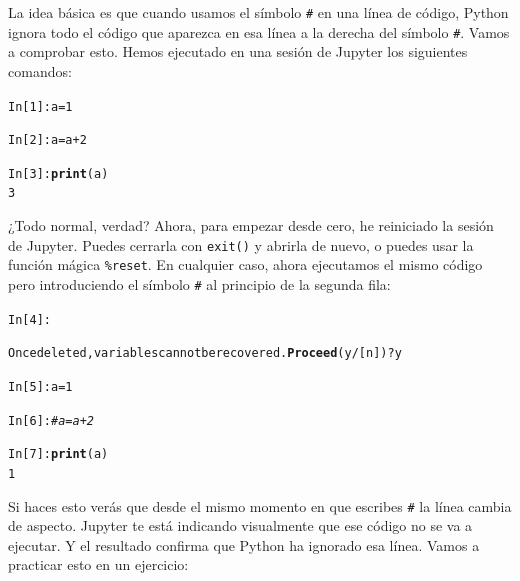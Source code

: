 \documentclass[10pt,a4paper]{article}\usepackage[]{graphicx}\usepackage[]{color}
\makeatletter
\newcommand{\hlnum}[1]{\textcolor[rgb]{0.686,0.059,0.569}{#1}}%
\newcommand{\hlcom}[1]{\textcolor[rgb]{0.678,0.584,0.686}{\textit{#1}}}%
\newcommand{\hlopt}[1]{\textcolor[rgb]{0,0,0}{#1}}%
\newcommand{\hlstd}[1]{\textcolor[rgb]{0.345,0.345,0.345}{#1}}%
\newcommand{\hlkwb}[1]{\textcolor[rgb]{0.69,0.353,0.396}{#1}}%
\newcommand{\hlkwd}[1]{\textcolor[rgb]{0.737,0.353,0.396}{\textbf{#1}}}%
\newenvironment{kframe}{%
 \def\at@end@of@kframe{}%
 \ifinner\ifhmode%
  \def\at@end@of@kframe{\end{minipage}}%
  \begin{minipage}{\columnwidth}%
 \fi\fi%
 \def\FrameCommand##1{\hskip\@totalleftmargin \hskip-\fboxsep
 \colorbox{shadecolor}{##1}\hskip-\fboxsep
     \hskip-\linewidth \hskip-\@totalleftmargin \hskip\columnwidth}%
 \MakeFramed {\advance\hsize-\width
   \@totalleftmargin\z@ \linewidth\hsize
   \@setminipage}}%
 {\par\unskip\endMakeFramed%
 \at@end@of@kframe}
\newenvironment{knitrout}{}{} %
\makeatother
\begin{document}
La idea básica es que cuando usamos el símbolo \verb&#& en una línea de código, Python ignora todo el código que aparezca en esa línea a la derecha del símbolo \verb&#&. Vamos a comprobar esto. Hemos ejecutado en una sesión de Jupyter los siguientes comandos:
\begin{knitrout}
\color{fgcolor}\begin{kframe}
\begin{alltt}
\hlstd{In [}\hlnum{1}\hlstd{]}\hlopt{:} \hlstd{a} \hlkwb{=} \hlnum{1}

\hlstd{In [}\hlnum{2}\hlstd{]}\hlopt{:} \hlstd{a} \hlkwb{=} \hlstd{a} \hlopt{+} \hlnum{2}

\hlstd{In [}\hlnum{3}\hlstd{]}\hlopt{:} \hlkwd{print}\hlstd{(a)}
\hlnum{3}
\end{alltt}
\end{kframe}
\end{knitrout}
¿Todo normal, verdad? Ahora, para empezar desde cero, he reiniciado la sesión de Jupyter. Puedes cerrarla con {\tt exit()} y abrirla de nuevo, o puedes usar la función mágica \verb#%reset#.
En cualquier caso, ahora ejecutamos el mismo código pero introduciendo el símbolo \verb&#& al principio de la segunda fila:
\begin{knitrout}
\color{fgcolor}\begin{kframe}
\begin{alltt}
In [4]: %

Once deleted, variables cannot be recovered. \hlkwd{Proceed} (y/[n])? y

In [5]: a = 1

In [6]: \hlcom{# a = a + 2}

In [7]: \hlkwd{print}(a)
1
\end{alltt}
\end{kframe}
\end{knitrout}
Si haces esto verás que desde el mismo momento en que escribes \verb&#& la línea cambia de aspecto. Jupyter te está indicando visualmente que ese código no se va a ejecutar. Y el resultado confirma que Python ha ignorado esa línea.  Vamos a practicar esto en un ejercicio:
\end{document}
